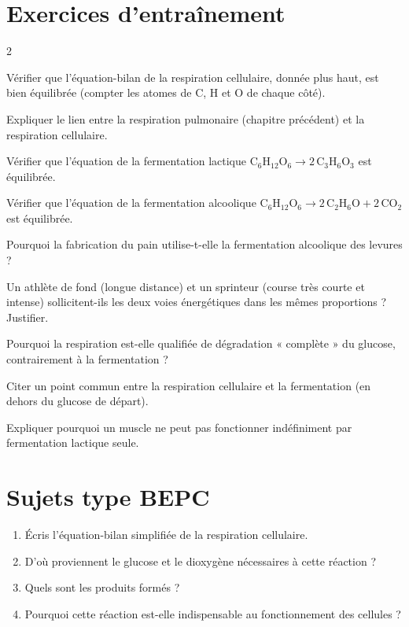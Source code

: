 \section{Exercices d'entraînement}
\begin{multicols}{2}

\exo{} Vérifier que l'équation-bilan de la respiration cellulaire, donnée plus
haut, est bien équilibrée (compter les atomes de C, H et O de chaque côté).

\exo{} Expliquer le lien entre la respiration pulmonaire (chapitre précédent) et
la respiration cellulaire.

\exo{} Vérifier que l'équation de la fermentation lactique
$\mathrm{C_6H_{12}O_6\to2\,C_3H_6O_3}$ est équilibrée.

\exo{} Vérifier que l'équation de la fermentation alcoolique
$\mathrm{C_6H_{12}O_6\to2\,C_2H_6O+2\,CO_2}$ est équilibrée.

\exo{} Pourquoi la fabrication du pain utilise-t-elle la fermentation alcoolique
des levures ?

\exo{} Un athlète de fond (longue distance) et un sprinteur (course très courte
et intense) sollicitent-ils les deux voies énergétiques dans les mêmes proportions ?
Justifier.

\exo{} Pourquoi la respiration est-elle qualifiée de dégradation « complète » du
glucose, contrairement à la fermentation ?

\exo{} Citer un point commun entre la respiration cellulaire et la fermentation
(en dehors du glucose de départ).

\exo{} Expliquer pourquoi un muscle ne peut pas fonctionner indéfiniment par
fermentation lactique seule.

\end{multicols}

\section{Sujets type BEPC}

\begin{enumerate}[label=\arabic*)]
\item Écris l'équation-bilan simplifiée de la respiration cellulaire.
\item D'où proviennent le glucose et le dioxygène nécessaires à cette réaction ?
\item Quels sont les produits formés ?
\item Pourquoi cette réaction est-elle indispensable au fonctionnement des cellules ?
\end{enumerate}

